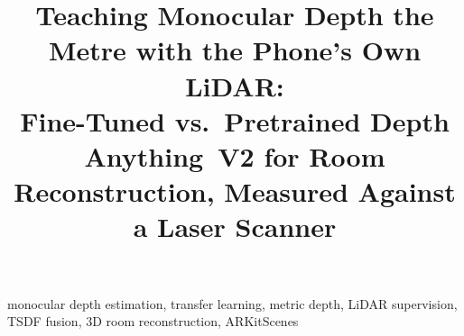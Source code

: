 \documentclass[conference]{IEEEtran}
\begin{document}
\title{Teaching Monocular Depth the Metre with the Phone's Own LiDAR:\\
Fine-Tuned vs.\ Pretrained Depth Anything~V2 for Room Reconstruction, Measured Against a Laser Scanner}

\author{
}

\maketitle




\begin{IEEEkeywords}
monocular depth estimation, transfer learning, metric depth, LiDAR supervision, TSDF fusion, 3D room reconstruction, ARKitScenes
\end{IEEEkeywords}













\end{document}
